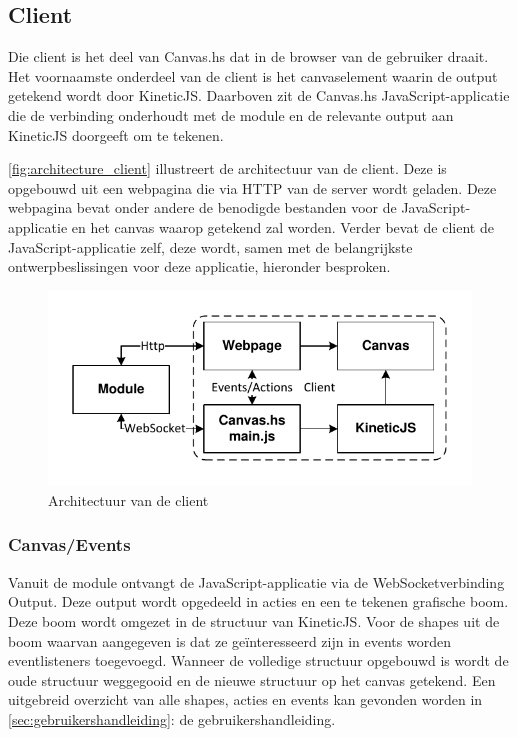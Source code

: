 
\subsection{Client}
Die client is het deel van Canvas.hs dat in de browser van de gebruiker draait. Het voornaamste onderdeel van de client is het canvaselement waarin de output getekend wordt door KineticJS. Daarboven zit de Canvas.hs JavaScript-applicatie die de verbinding onderhoudt met de module en de relevante output aan KineticJS doorgeeft om te tekenen.

\autoref{fig:architecture_client} illustreert de architectuur van de client. Deze is opgebouwd uit een webpagina die via HTTP van de server wordt geladen. Deze webpagina bevat onder andere de benodigde bestanden voor de JavaScript-applicatie en het canvas waarop getekend zal worden. Verder bevat de client de JavaScript-applicatie zelf, deze wordt, samen met de belangrijkste ontwerpbeslissingen voor deze applicatie, hieronder besproken.

\begin{figure}
\begin{center}
\includegraphics[keepaspectratio,width=\textwidth]{./images/client_architecture.pdf}
\caption{Architectuur van de client}
\label{fig:architecture_client}
\end{center}
\end{figure}

\subsubsection{Canvas/Events}
Vanuit de module ontvangt de JavaScript-applicatie via de WebSocketverbinding Output. Deze output wordt opgedeeld in acties en een te tekenen grafische boom. Deze boom wordt omgezet in de structuur van KineticJS. Voor de shapes uit de boom waarvan aangegeven is dat ze ge\"interesseerd zijn in events worden eventlisteners toegevoegd. Wanneer de volledige structuur opgebouwd is wordt de oude structuur weggegooid en de nieuwe structuur op het canvas getekend. Een uitgebreid overzicht van alle shapes, acties en events kan gevonden worden in \autoref{sec:gebruikershandleiding}: de gebruikershandleiding.

